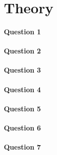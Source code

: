 \newpage
\thispagestyle{empty}
\section{Theory}

\paragraph{Question 1}
\paragraph{Question 2}
\paragraph{Question 3}
\paragraph{Question 4}
\paragraph{Question 5}
\paragraph{Question 6}
\paragraph{Question 7}
